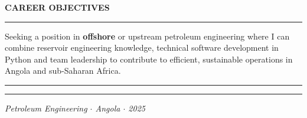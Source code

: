 \documentclass[10pt,a4paper]{article}
\newcommand{\mainSection}[1]{%
  \vspace{4pt}%
  {\bfseries\color{navy}\large\MakeUppercase{#1}}%
  \par\vspace{0pt}%
  {\color{navy}\rule{\linewidth}{1.0pt}}%
  \par\vspace{2pt}%
}
\begin{document}
\begin{minipage}[t]{\dimexpr 0.705\paperwidth - 26pt}
  \mainSection{Career Objectives}
  Seeking a position in \textbf{offshore} or upstream petroleum engineering where I can
  combine reservoir engineering knowledge, technical software development in Python
  and team leadership to contribute to efficient, sustainable operations in Angola
  and sub-Saharan Africa.

  \vspace{6pt}
  {\color{navy}\rule{\linewidth}{0.8pt}}\par
  \vspace{1pt}
  {\color{goldrule}\rule{\linewidth}{0.4pt}}\par
  \vspace{3pt}
  {\footnotesize\color{mutedtext}\itshape
    Petroleum Engineering $\cdot$ Angola $\cdot$ 2025}

\end{minipage}
\end{document}
